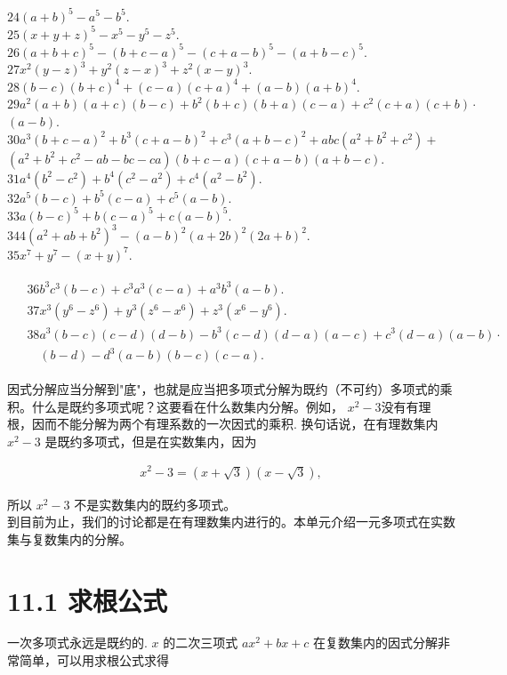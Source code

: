 \documentclass[10pt]{article}
\begin{document}
$24(a+b)^{5}-a^{5}-b^{5}$.\\
$25(x+y+z)^{5}-x^{5}-y^{5}-z^{5}$.\\
$26(a+b+c)^{5}-(b+c-a)^{5}-(c+a-b)^{5}-(a+b-c)^{5}$.\\
$27 x^{2}(y-z)^{3}+y^{2}(z-x)^{3}+z^{2}(x-y)^{3}$.\\
$28(b-c)(b+c)^{4}+(c-a)(c+a)^{4}+(a-b)(a+b)^{4}$.\\
$29 a^{2}(a+b)(a+c)(b-c)+b^{2}(b+c)(b+a)(c-a)+c^{2}(c+a)(c+b) \cdot$ $(a-b)$.\\
$30 a^{3}(b+c-a)^{2}+b^{3}(c+a-b)^{2}+c^{3}(a+b-c)^{2}+a b c\left(a^{2}+b^{2}+c^{2}\right)+$ $\left(a^{2}+b^{2}+c^{2}-a b-b c-c a\right)(b+c-a)(c+a-b)(a+b-c)$.\\
$31 a^{4}\left(b^{2}-c^{2}\right)+b^{4}\left(c^{2}-a^{2}\right)+c^{4}\left(a^{2}-b^{2}\right)$.\\
$32 a^{5}(b-c)+b^{5}(c-a)+c^{5}(a-b)$.\\
$33 a(b-c)^{5}+b(c-a)^{5}+c(a-b)^{5}$.\\
$344\left(a^{2}+a b+b^{2}\right)^{3}-(a-b)^{2}(a+2 b)^{2}(2 a+b)^{2}$.\\
$35 x^{7}+y^{7}-(x+y)^{7}$.

\begin{align*}
\begin{aligned}
& 36 b^{3} c^{3}(b-c)+c^{3} a^{3}(c-a)+a^{3} b^{3}(a-b) . \\
& 37 x^{3}\left(y^{6}-z^{6}\right)+y^{3}\left(z^{6}-x^{6}\right)+z^{3}\left(x^{6}-y^{6}\right) . \\
& 38 a^{3}(b-c)(c-d)(d-b)-b^{3}(c-d)(d-a)(a-c)+c^{3}(d-a)(a-b) \cdot \\
& \quad(b-d)-d^{3}(a-b)(b-c)(c-a) .
\end{aligned}
\end{align*}

因式分解应当分解到"底"，也就是应当把多项式分解为既约（不可约）多项式的乘积。什么是既约多项式呢？这要看在什么数集内分解。例如， $x^{2}-3$没有有理根，因而不能分解为两个有理系数的一次因式的乘积. 换句话说，在有理数集内 $x^{2}-3$ 是既约多项式，但是在实数集内，因为

\begin{align*}
x^{2}-3=(x+\sqrt{3})(x-\sqrt{3}),
\end{align*}

所以 $x^{2}-3$ 不是实数集内的既约多项式。\\
到目前为止，我们的讨论都是在有理数集内进行的。本单元介绍一元多项式在实数集与复数集内的分解。

\section*{11.1 求根公式}
一次多项式永远是既约的. $x$ 的二次三项式 $a x^{2}+b x+c$ 在复数集内的因式分解非常简单，可以用求根公式求得
\end{document}

